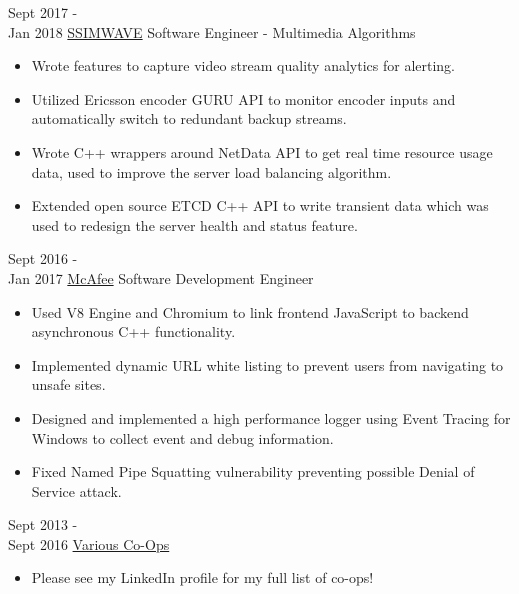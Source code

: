 \documentclass[letterpaper]{twentysecondcv} %
\begin{document}
\begin{twenty} %
		\twentyitem
    	{Sept 2017 -\\Jan 2018}
        {\href{https://www.ssimwave.com}{SSIMWAVE}}
        {Software Engineer - Multimedia Algorithms}
        {}
        {
        {\begin{itemize}
        \item Wrote features to capture video stream quality analytics for alerting.
        \item Utilized Ericsson encoder GURU API to monitor encoder inputs and automatically switch to redundant backup streams.
        \item Wrote C++ wrappers around NetData API to get real time resource usage data, used to improve the server load balancing algorithm.
        \item Extended open source ETCD C++ API to write transient data which was used to redesign the server health and status feature.
    \end{itemize}}
        }

	\twentyitem
    	{Sept 2016 - \\Jan 2017}
        {\href{https://www.mcafee.com/ca/index.html}{McAfee}}
        {Software Development Engineer}
        {}
        {
        {\begin{itemize}
        \item Used V8 Engine and Chromium to link frontend JavaScript to backend asynchronous C++ functionality.
        \item Implemented dynamic URL white listing to prevent users from navigating to unsafe sites.
        \item Designed and implemented a high performance logger using Event Tracing for Windows to collect event and debug information.
        \item Fixed Named Pipe Squatting vulnerability preventing possible Denial of Service attack.
    \end{itemize}}
        }
        
        	\twentyitem
    	{Sept 2013 - \\ Sept 2016}
        {\href{https://linkedin.com/in/davan-basran}{Various Co-Ops}}
        {}
        {}
        {
        {\begin{itemize}
        \item Please see my LinkedIn profile for my full list of co-ops!
    \end{itemize}}
        }
        
\end{twenty}
\end{document}
